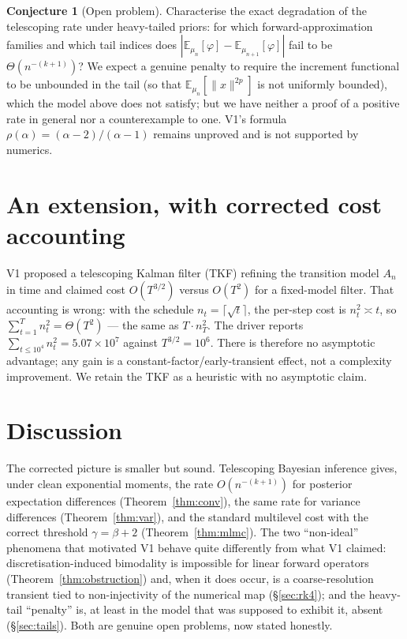 \documentclass[11pt]{article}
\theoremstyle{definition}
\newtheorem{conjecture}[theorem]{Conjecture}
\theoremstyle{remark}
\newcommand{\E}{\mathbb{E}}
\begin{document}
\begin{conjecture}[Open problem]\label{conjecture}
Characterise the exact degradation of the telescoping rate under heavy-tailed priors: for which
forward-approximation families and which tail indices does $|\E_{\mu_n}[\varphi]-\E_{\mu_{n+1}}[\varphi]|$
fail to be $\Theta(n^{-(k+1)})$? We expect a genuine penalty to require the increment functional to
be unbounded in the tail (so that $\E_{\mu_n}[\|x\|^{2p}]$ is not uniformly bounded), which the
model above does not satisfy; but we have neither a proof of a positive rate in general nor a
counterexample to one. V1's formula $\rho(\alpha)=(\alpha-2)/(\alpha-1)$ remains unproved and is not
supported by numerics.
\end{conjecture}

\section{An extension, with corrected cost accounting}\label{sec:tkf}
V1 proposed a telescoping Kalman filter (TKF) refining the transition model $A_n$ in time and claimed
cost $O(T^{3/2})$ versus $O(T^2)$ for a fixed-model filter. That accounting is wrong: with the
schedule $n_t=\lceil\sqrt t\rceil$, the per-step cost is $n_t^2\asymp t$, so
$\sum_{t=1}^T n_t^2=\Theta(T^2)$ --- the same as $T\cdot n_T^2$. The driver reports
$\sum_{t\le10^4}n_t^2=5.07\times10^7$ against $T^{3/2}=10^6$. There is therefore no asymptotic
advantage; any gain is a constant-factor/early-transient effect, not a complexity improvement. We
retain the TKF as a heuristic with no asymptotic claim.

\section{Discussion}
The corrected picture is smaller but sound. Telescoping Bayesian inference gives, under clean
exponential moments, the rate $O(n^{-(k+1)})$ for posterior expectation differences
(Theorem~\ref{thm:conv}), the same rate for variance differences (Theorem~\ref{thm:var}), and the
standard multilevel cost with the correct threshold $\gamma=\beta+2$ (Theorem~\ref{thm:mlmc}). The
two ``non-ideal'' phenomena that motivated V1 behave quite differently from what V1 claimed:
discretisation-induced bimodality is impossible for linear forward operators
(Theorem~\ref{thm:obstruction}) and, when it does occur, is a coarse-resolution transient tied to
non-injectivity of the numerical map (\S\ref{sec:rk4}); and the heavy-tail ``penalty'' is, at least
in the model that was supposed to exhibit it, absent (\S\ref{sec:tails}). Both are genuine open
problems, now stated honestly.
\end{document}
